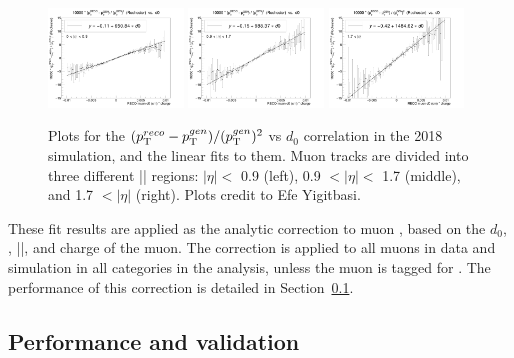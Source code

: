 \begin{figure}[!htb]
      \centering
      \captionsetup{justification=justified}
      \includegraphics[width=0.32\textwidth]{pics/muon_corr/GeoFit/fit_results/2018_DY_eta_0_0p9_dRelPt2p0_Roch.png}
      \includegraphics[width=0.32\textwidth]{pics/muon_corr/GeoFit/fit_results/2018_DY_eta_0p9_1p7_dRelPt2p0_Roch.png}
      \includegraphics[width=0.32\textwidth]{pics/muon_corr/GeoFit/fit_results/2018_DY_eta_1p7_inf_dRelPt2p0_Roch.png}
      \caption{Plots for the $(p_{\mathrm{T}}^{reco}-p_{\mathrm{T}}^{gen})/ (p_{\mathrm{T}}^{gen})^{2}$ vs $d_0$ correlation in the 2018 \DY simulation, 
               and the linear fits to them. Muon tracks are divided into three different |\eta| regions:
               $|\eta| <$ 0.9 (left), 0.9 $< |\eta| <$ 1.7 (middle), and 1.7 $< |\eta|$ (right).
               Plots credit to Efe Yigitbasi.}
      \label{fig:geofit_param_2018}
\end{figure}

These fit results are applied as the analytic correction to muon \pt, 
based on the $d_0$, \pt, |\eta|, and charge of the muon.
The correction is applied to all muons in data and simulation in all categories in the \hmm analysis, 
unless the muon is tagged for \FSR.
The performance of this correction is detailed in Section~\ref{sec:perf_geofit}.

\subsection{Performance and validation}\label{sec:perf_geofit}

